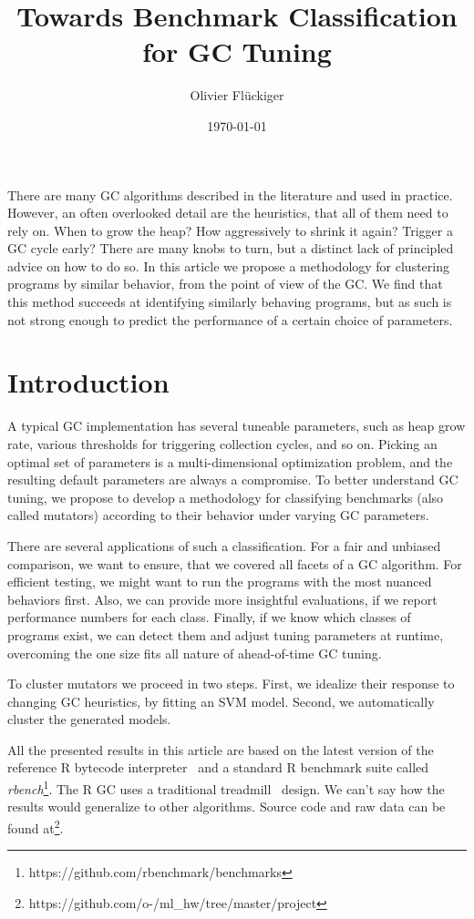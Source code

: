 \documentclass[12pt]{article}
\title{Towards Benchmark Classification for GC Tuning}
\author{Olivier Fl\"uckiger}
\date{\today}
\begin{document}
\maketitle

\abstract

There are many GC algorithms described in the literature and used in practice.
However, an often overlooked detail are the heuristics, that all of them need to rely on.
When to grow the heap? How aggressively to shrink it again? Trigger a GC cycle early?
There are many knobs to turn, but a distinct lack of principled advice on how to do so.
In this article we propose a methodology for clustering programs by similar behavior, from the point of view of the GC.
We find that this method succeeds at identifying similarly behaving programs, but as such is not strong enough to predict the performance of a certain choice of parameters.

\vspace{2mm}
\section{Introduction}
A typical GC implementation has several tuneable parameters, such as heap grow rate, various thresholds for triggering collection cycles, and so on.
Picking an optimal set of parameters is a multi-dimensional optimization problem, and the resulting default parameters are always a compromise.
To better understand GC tuning, we propose to develop a methodology for classifying benchmarks (also called mutators) according to their behavior under varying GC parameters.

There are several applications of such a classification.
For a fair and unbiased comparison, we want to ensure, that we covered all facets of a GC algorithm.
For efficient testing, we might want to run the programs with the most nuanced behaviors first.
Also, we can provide more insightful evaluations, if we report performance numbers for each class.
Finally, if we know which classes of programs exist, we can detect them and adjust tuning parameters at runtime, overcoming the one size fits all nature of ahead-of-time GC tuning.

To cluster mutators we proceed in two steps.
First, we idealize their response to changing GC heuristics, by fitting an SVM model.
Second, we automatically cluster the generated models.

All the presented results in this article are based on the latest version of the reference R bytecode interpreter~\cite{r} and a standard R benchmark suite called \emph{rbench}\footnote{https://github.com/rbenchmark/benchmarks}.
The R GC uses a traditional treadmill~\cite{baker1992treadmill} design. We can't say how the results would generalize to other algorithms.
Source code and raw data can be found at\footnote{https://github.com/o-/ml\_hw/tree/master/project}.
\end{document}

